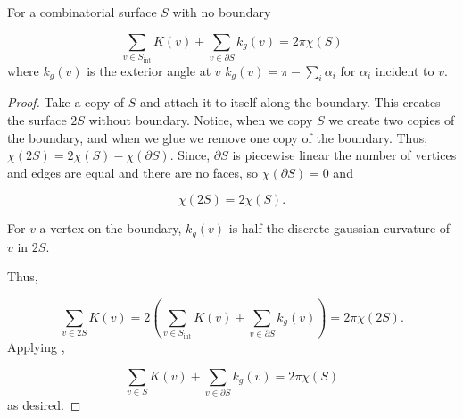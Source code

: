 \begin{theorem}\label{thm:g-b-discete}
For a combinatorial surface $S$ with no boundary

$$\sum_{v\in S_{\text{int}}} K(v)+\sum_{v\in\partial S}k_g(v)=2\pi \chi(S)$$
where $k_g(v)$ is the exterior angle at $v$ 
$k_g(v)=\pi-\sum_i\alpha_i$ for $\alpha_i$ incident to $v$.
\end{theorem}

\begin{proof}
Take a copy of $S$ and attach it to itself along the boundary.
This creates the surface $2S$ without boundary. Notice,
when we copy $S$ we create two copies of the boundary, and when
we glue we remove one copy of the boundary.
Thus, $\chi(2S)=2\chi(S)-\chi(\partial S).$
Since, $\partial S$ is piecewise linear the number of vertices and
edges are equal and there are no faces, so $\chi(\partial S)=0$
and 

\begin{equation} \label{eqn:glue}
\chi(2S)=2\chi(S).
\end{equation}

For $v$ a vertex on the boundary, $k_g(v)$ is half
the discrete gaussian curvature of $v$ in $2S.$

Thus,

$$\sum_{v\in 2S}K(v)=2\left(\sum_{v\in S_{\text{int}}}K(v)+\sum_{v\in \partial S} k_g(v)\right) =2\pi  \chi(2S).$$
Applying ,

$$\sum_{v\in S}K(v)+\sum_{v\in \partial S} k_g(v)=2\pi  \chi(S)$$
as desired.

\end{proof}